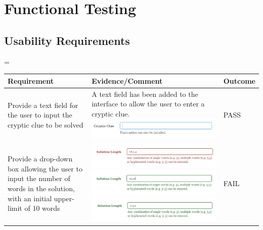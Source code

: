 \section{Functional Testing}
\label{sec:functional_testing}

\subsection{Usability Requirements}
\label{sub:test_func_usability}

\begin{landscape}
  \centering
  \setlength\LTleft{0pt}            %
  \setlength\LTright{0pt}           %
  \LTcapwidth=\textwidth
  \begin{longtable}{|L{5cm}|L{15cm}|C{2cm}|}
    \hline
    {\bfseries Requirement} & {\bfseries Evidence/Comment} & {\bfseries Outcome} \\
    \hline
    Provide a text field for the user to input the cryptic clue to be solved
    &  A text field has been added to the interface to allow the user to enter a cryptic clue. 
 \includegraphics[keepaspectratio=true,scale=0.9]{evidence/enterclue.png}
    & PASS \\ \hline
    Provide a drop-down box allowing the user to input the
number of words in the solution, with an initial upper-
limit of 10 words
    & \includegraphics[keepaspectratio=true]{evidence/dropdown1.png}
\includegraphics[keepaspectratio=true]{evidence/dropdown2.png}
\includegraphics[keepaspectratio=true]{evidence/dropdown3.png} & FAIL \\ \hline

\end{longtable}
\end{landscape}
